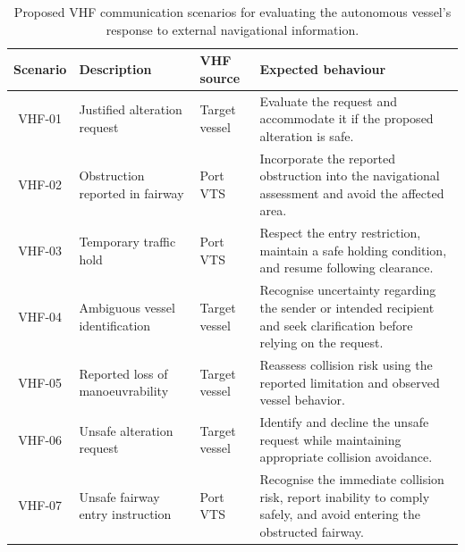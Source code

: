 \documentclass[10pt]{reportMaster}
\begin{document}
\begin{table}[t]
\centering
\caption{Proposed VHF communication scenarios for evaluating
the autonomous vessel's response to external navigational information.}
\label{tab:vhf-scenarios}
\begin{threeparttable}

\small
\setlength{\tabcolsep}{5pt}
\renewcommand{\arraystretch}{1.2}

\begin{tabular}{@{}c p{3.2cm} p{1.8cm} p{5.2cm}@{}}
\toprule
\textbf{Scenario}
& \textbf{Description}
& \textbf{VHF source}
& \textbf{Expected behaviour} \\
\midrule

VHF-01
& Justified alteration request
& Target vessel
& Evaluate the request and accommodate it if
the proposed alteration is safe. \\

\addlinespace
VHF-02
& Obstruction reported in fairway
& Port VTS
& Incorporate the reported obstruction into
the navigational assessment and avoid the
affected area. \\

\addlinespace
VHF-03
& Temporary traffic hold
& Port VTS
& Respect the entry restriction, maintain
a safe holding condition, and resume
following clearance. \\

\addlinespace
VHF-04
& Ambiguous vessel identification
& Target vessel
& Recognise uncertainty regarding the
sender or intended recipient and seek
clarification before relying on the request. \\

\addlinespace
VHF-05
& Reported loss of manoeuvrability
& Target vessel
& Reassess collision risk using the reported
limitation and observed vessel behavior. \\

\addlinespace
VHF-06
& Unsafe alteration request
& Target vessel
& Identify and decline the unsafe request
while maintaining appropriate collision
avoidance. \\

\addlinespace
VHF-07
& Unsafe fairway entry instruction
& Port VTS
& Recognise the immediate collision risk,
report inability to comply safely, and
avoid entering the obstructed fairway. \\

\bottomrule
\end{tabular}


\end{threeparttable}
\end{table}
\end{document}
